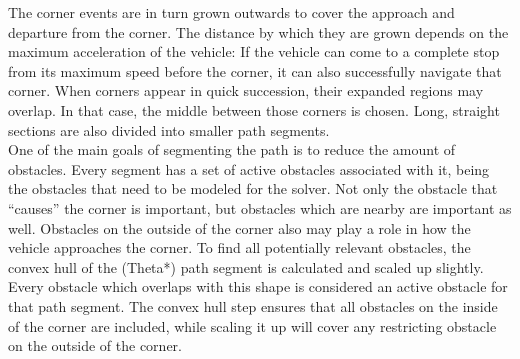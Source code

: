 The corner events are in turn grown outwards to cover the approach and departure from the corner. The distance by which they are grown depends on the maximum acceleration of the vehicle: If the vehicle can come to a complete stop from its maximum speed before the corner, it can also successfully navigate that corner. When corners appear in quick succession, their expanded regions may overlap. In that case, the middle between those corners is chosen. Long, straight sections are also divided into smaller path segments.\\
One of the main goals of segmenting the path is to reduce the amount of obstacles. Every segment has a set of active obstacles associated with it, being the obstacles that need to be modeled for the solver. Not only the obstacle that ``causes'' the corner is important, but obstacles which are nearby are important as well. Obstacles on the outside of the corner also may play a role in how the vehicle approaches the corner. To find all potentially relevant obstacles, the convex hull of the (Theta*) path segment is calculated and scaled up slightly. Every obstacle which overlaps with this shape is considered an active obstacle for that path segment. The convex hull step ensures that all obstacles on the inside of the corner are included, while scaling it up will cover any restricting obstacle on the outside of the corner.
